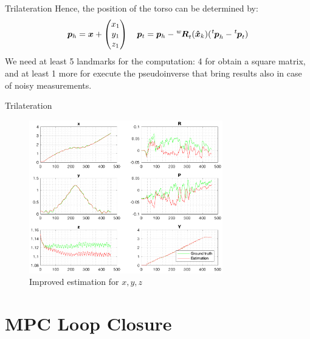 \documentclass[10pt]{beamer}
\begin{document}
    \begin{frame}[fragile]{Trilateration}
        Hence, the position of the torso can be determined by:
        \begin{equation*}
            \bm{p}_h
                =
            \bm{x} +
            \begin{pmatrix}
                x_1 \\
                y_1 \\
                z_1
            \end{pmatrix} \quad
            \bm{p}_t = \bm{p}_h - \tensor[^w]{\bm{R}}{_t}(\bm{\hat{x}}_{k}) (\tensor[^t]{\bm{p}}{_h} - \tensor[^t]{\bm{p}}{_t})
        \end{equation*}
        We need at least 5 landmarks for the computation: 4 for obtain a
        square matrix, and at least 1 more for execute the pseudoinverse that
        bring results also in case of noisy measurements.
    \end{frame}

    \begin{frame}[fragile]{Trilateration}
        \begin{figure}
        \caption{Improved estimation for $x, y, z$}
        \centering
        \includegraphics[width=0.75\textwidth]{images/trilateration.png}
        \end{figure}
    \end{frame}

    \section{MPC Loop Closure}
\end{document}
